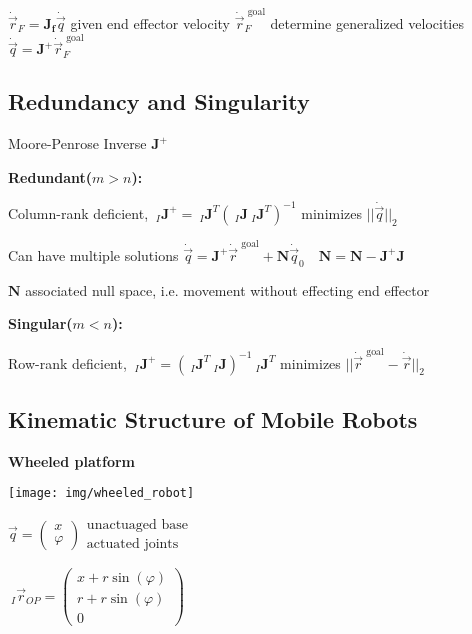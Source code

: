 \documentclass[fontsize=6pt]{scrartcl}
\newcommand{\mat}[1]{\mathbf{#1}}
\begin{document}
\begin{multicols*}{4}
$\dot{\vec r}_F = \mat{J_f}\dot{\vec q}$ given end effector velocity $\dot{\vec r}_F^\text{ goal}$ determine generalized velocities $\dot{\vec{q}} = \mat J^+ \dot{\vec{r}}_F^\text{ goal}$

\subsection*{Redundancy and Singularity}

Moore-Penrose Inverse $ \mat J^+$

\textbf{Redundant($m>n$):}

Column-rank deficient, $~_I\mat J^+ = ~_I\mat J^T(~_I\mat J ~_I\mat J^T)^{-1}$ minimizes $||\dot{\vec{q}}||_2$

Can have multiple solutions $\dot{\vec q} = \mat J^+ \dot{\vec r}^\text{ goal} + \mat N \dot{\vec{q}}_0 \quad \mat N = \mat N - \mat J^+\mat J$

$\mat N$ associated null space, i.e. movement without effecting end effector

\textbf{Singular($m<n$):}

Row-rank deficient, $~_I\mat J^+ = (~_I\mat J^T ~_I\mat J)^{-1}~_I\mat J^T$ minimizes $||\dot{\vec{r}}^\text{ goal} - \dot{\vec{r}}||_2$

\begin{samepage}
\subsection*{Kinematic Structure of Mobile Robots}

\begin{minipage}{0.35\linewidth}
\textbf{Wheeled platform}

\texttt{[image: img/wheeled\_robot]}

\end{minipage}
\end{samepage}
\begin{minipage}{0.65\linewidth}
$\vec{q} = \begin{pmatrix}
x\\
\varphi
\end{pmatrix}
\begin{matrix}
\text{unactuaged base}\\
\text{actuated joints}
\end{matrix}
$

$ ~_I\vec{r}_{OP}=
\begin{pmatrix}
x + r \sin(\varphi)\\
r + r \sin(\varphi)\\
0
\end{pmatrix}
$


\end{minipage}
\end{multicols*}
\end{document}
